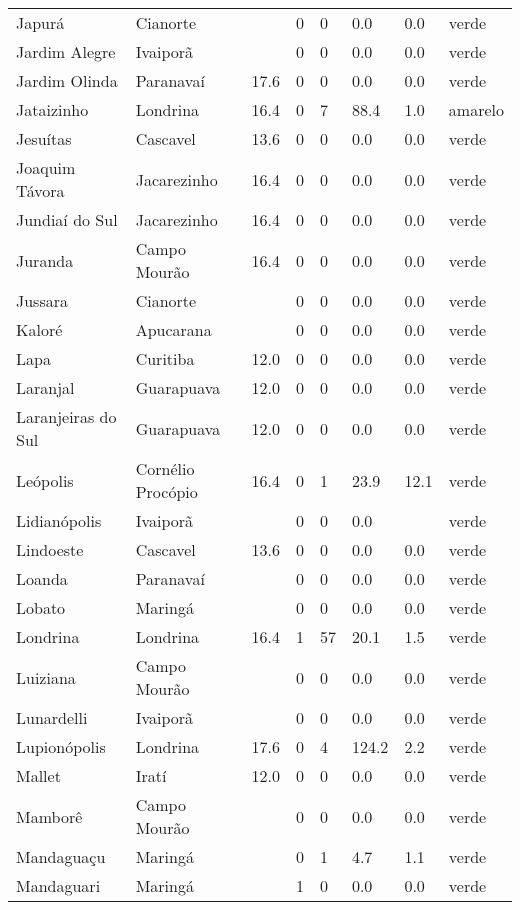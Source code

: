 \begin{longtable}{l|lllllll}
  Japurá & Cianorte &  & 0 & 0 & 0.0 & 0.0 & verde \\ 
  Jardim Alegre & Ivaiporã &  & 0 & 0 & 0.0 & 0.0 & verde \\ 
  Jardim Olinda & Paranavaí & 17.6 & 0 & 0 & 0.0 & 0.0 & verde \\ 
  Jataizinho & Londrina & 16.4 & 0 & 7 & 88.4 & 1.0 & amarelo \\ 
  Jesuítas & Cascavel & 13.6 & 0 & 0 & 0.0 & 0.0 & verde \\ 
  Joaquim Távora & Jacarezinho & 16.4 & 0 & 0 & 0.0 & 0.0 & verde \\ 
  Jundiaí do Sul & Jacarezinho & 16.4 & 0 & 0 & 0.0 & 0.0 & verde \\ 
  Juranda & Campo Mourão & 16.4 & 0 & 0 & 0.0 & 0.0 & verde \\ 
  Jussara & Cianorte &  & 0 & 0 & 0.0 & 0.0 & verde \\ 
  Kaloré & Apucarana &  & 0 & 0 & 0.0 & 0.0 & verde \\ 
  Lapa & Curitiba & 12.0 & 0 & 0 & 0.0 & 0.0 & verde \\ 
  Laranjal & Guarapuava & 12.0 & 0 & 0 & 0.0 & 0.0 & verde \\ 
  Laranjeiras do Sul & Guarapuava & 12.0 & 0 & 0 & 0.0 & 0.0 & verde \\ 
  Leópolis & Cornélio Procópio & 16.4 & 0 & 1 & 23.9 & 12.1 & verde \\ 
  Lidianópolis & Ivaiporã &  & 0 & 0 & 0.0 &  & verde \\ 
  Lindoeste & Cascavel & 13.6 & 0 & 0 & 0.0 & 0.0 & verde \\ 
  Loanda & Paranavaí &  & 0 & 0 & 0.0 & 0.0 & verde \\ 
  Lobato & Maringá &  & 0 & 0 & 0.0 & 0.0 & verde \\ 
  Londrina & Londrina & 16.4 & 1 & 57 & 20.1 & 1.5 & verde \\ 
  Luiziana & Campo Mourão &  & 0 & 0 & 0.0 & 0.0 & verde \\ 
  Lunardelli & Ivaiporã &  & 0 & 0 & 0.0 & 0.0 & verde \\ 
  Lupionópolis & Londrina & 17.6 & 0 & 4 & 124.2 & 2.2 & verde \\ 
  Mallet & Iratí & 12.0 & 0 & 0 & 0.0 & 0.0 & verde \\ 
  Mamborê & Campo Mourão &  & 0 & 0 & 0.0 & 0.0 & verde \\ 
  Mandaguaçu & Maringá &  & 0 & 1 & 4.7 & 1.1 & verde \\ 
  Mandaguari & Maringá &  & 1 & 0 & 0.0 & 0.0 & verde \\ 

\end{longtable}
